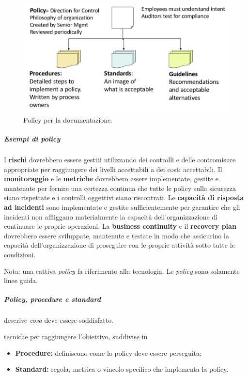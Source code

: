 \begin{figure}[h!]
        \begin{center}
                \includegraphics[scale=0.4]{res/img/documentation_policy}
        \end{center}
        \caption{Policy per la documentazione.}
\end{figure}

\subparagraph{Esempi di policy}

I \textbf{rischi} dovrebbero essere gestiti utilizzando dei controlli e delle 
contromisure appropriate per raggiungere dei livelli accettabili a dei costi 
accettabili. Il \textbf{monitoraggio} e le \textbf{metriche} dovrebbero essere 
implementate, gestite e mantenute per fornire una certezza continua che tutte 
le policy sulla sicurezza siano rispettate e i controlli oggettivi siano 
riscontrati. Le \textbf{capacità di risposta ad incidenti} sono implementate e 
gestite sufficientemente per garantire che gli incidenti non affliggano 
materialmente 
la capacità dell'organizzazione di continuare le proprie operazioni. 
La \textbf{business continuity} e il \textbf{recovery plan} dovrebbero essere 
sviluppate, mantenute e testate in modo che assicurino la capacità 
dell'organizzazione di proseguire con le proprie attività sotto tutte le 
condizioni.

Nota: una cattiva \textit{policy} fa riferimento alla tecnologia. Le 
\textit{policy} sono solamente linee guida.

\subparagraph{Policy, procedure e standard}

 descrive \textit{cosa} deve essere 
soddisfatto.

 tecniche per raggiungere 
l'obiettivo, suddivise in
\begin{itemize}
\item \textbf{Procedure:} definiscono come la policy deve essere perseguita;
\item \textbf{Standard:} regola, metrica o vincolo specifico che implementa la 
policy.
\end{itemize}

